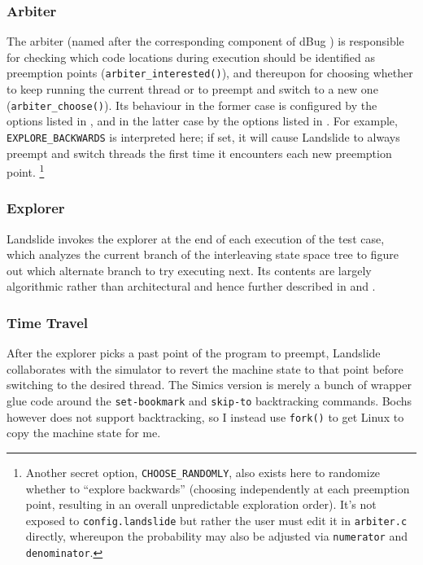 \subsubsection{Arbiter}
\label{sec:landslide-arbiter}

The arbiter (named after the corresponding component of dBug \cite{dbug-ssv})
is responsible for checking which code locations during execution should be identified as preemption points
({\tt arbiter\_interested()}),
and thereupon for choosing whether to keep running the current thread or to preempt and switch to a new one
({\tt arbiter\_choose()}).
Its behaviour in the former case is configured by the options listed in \sect{\ref{sec:landslide-dynamicconfig}},
and in the latter case by the options listed in \sect{\ref{sec:landslide-staticconfig}}.
For example, {\tt EXPLORE\_BACKWARDS} is interpreted here;
if set, it will cause Landslide to always preempt and switch threads the first time it encounters each new preemption point.%
\footnote{Another secret option, {\tt CHOOSE\_RANDOMLY},
also exists here to randomize whether to ``explore backwards''
(choosing independently at each preemption point, resulting in an overall unpredictable exploration order).
It's not exposed to {\tt config.landslide} but rather the user must edit it in {\tt arbiter.c} directly,
whereupon the probability may also be adjusted via {\tt numerator} and {\tt denominator}.}

\subsubsection{Explorer}

Landslide invokes the explorer at the end of each execution of the test case,
which analyzes the current branch of the interleaving state space tree
to figure out which alternate branch to try executing next.
Its contents are largely algorithmic rather than architectural
and hence further described in \sect{\ref{sec:landslide-dpor}} and \sect{\ref{sec:landslide-icb}}.

\subsubsection{Time Travel}
\label{sec:landslide-timetravel}

After the explorer picks a past point of the program to preempt, %
Landslide collaborates with the simulator to revert the machine state to that point before switching to the desired thread.
The Simics version is merely a bunch of wrapper glue code around the {\tt set-bookmark} and {\tt skip-to} backtracking commands.
Bochs however does not support backtracking, so I instead use {\tt fork()} to get Linux to copy the machine state for me.

